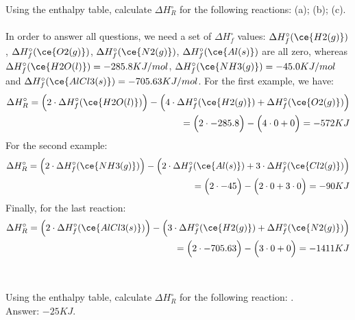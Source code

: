 \documentclass[main.tex]{subfiles}
\begin{document}
\begin{description}
\begin{example} %
Using the enthalpy table, calculate $\Delta H^{\circ}_R$ for the following reactions: (a); (b); (c).
\\
\\
In order to answer all questions, we need a set of $\Delta H^{\circ}_f$ values: $\Delta H^{\circ}_f(\ce{H2(g)})$, $\Delta H^{\circ}_f(\ce{O2(g)})$, $\Delta H^{\circ}_f(\ce{N2(g)})$, $\Delta H^{\circ}_f(\ce{Al(s)})$ are all zero, whereas $\Delta H^{\circ}_f(\ce{H2O(l)})=-285.8KJ/mol$, $\Delta H^{\circ}_f(\ce{NH3(g)})=-45.0KJ/mol$ and $\Delta H^{\circ}_f(\ce{AlCl3(s)})=-705.63KJ/mol$. For the first example, we have:
\begin{equation*}\begin{split}
  \Delta H^{\circ}_R= \Big(2\cdot \Delta H_f^{\circ}(\ce{H2O(l)})    \Big)-\Big(4\cdot \Delta H_f^{\circ}(\ce{H2(g)})+ \Delta H_f^{\circ}(\ce{O2(g)}) \Big)      \\
  =     \Big(2\cdot -285.8  \Big)-\Big( 4\cdot 0+0 \Big)= -572KJ
\end{split}\end{equation*}
For the second example:
\begin{equation*}\begin{split}
  \Delta H^{\circ}_R= \Big(2\cdot \Delta H_f^{\circ}(\ce{NH3(g)})    \Big)-\Big(2\cdot \Delta H_f^{\circ}(\ce{Al(s)})+ 3\cdot \Delta H_f^{\circ}(\ce{Cl2(g)}) \Big)      \\
  =     \Big(2\cdot -45 \Big)-\Big( 2\cdot 0+3\cdot0 \Big)= -90KJ
\end{split}\end{equation*}
Finally, for the last reaction:
\begin{equation*}\begin{split}
  \Delta H^{\circ}_R= \Big(2\cdot \Delta H_f^{\circ}(\ce{AlCl3(s)})    \Big)-\Big(3\cdot \Delta H_f^{\circ}(\ce{H2(g)})+ \Delta H_f^{\circ}(\ce{N2(g)}) \Big)      \\
  =     \Big(2\cdot -705.63  \Big)-\Big( 3\cdot 0+0 \Big)= -1411KJ
\end{split}\end{equation*}
\\
\faDiamond\ \\
Using the enthalpy table, calculate $\Delta H^{\circ}_R$ for the following reaction: .   
\\
\flushright Answer: $-25KJ$.
\end{example}%



\end{description}
\end{document}

